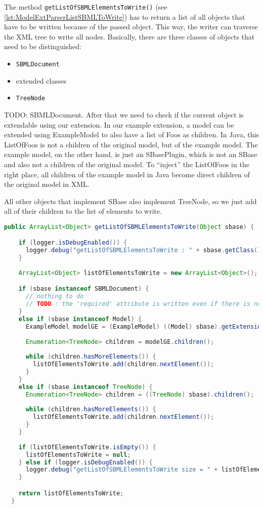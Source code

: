 The method \texttt{getListOfSBMLElementsToWrite()} (see \ref{lst:ModelExtParserListSBMLToWrite}) has to return a list of all objects that have to be written because of the passed object.
This way, the writer can traverse the XML tree to write all nodes.
Basically, there are three classes of objects that need to be distinguished:
\begin{itemize}
 \item \texttt{SBMLDocument}
 \item extended classes
 \item \texttt{TreeNode}
\end{itemize}
TODO: SBMLDocument.
After that we need to check if the current object is extendable using our extension.
In our example extension, a model can be extended using ExampleModel to also have a list of Foos as children.
In Java, this ListOfFoos is not a children of the original model, but of the example model.
The example model, on the other hand, is just an SBasePlugin, which is not an SBase and also not a children of the original model.
To ``inject'' the ListOfFoos in the right place, all children of the example model in Java become direct children of the original model in XML.

All other objects that implement SBase also implement TreeNode, so we just add all of their children to the list of elements to write.

\begin{lstlisting}[language=Java,caption={Extension parser: \texttt{getListOfSBMLElementsToWrite()}},label={lst:ModelExtParserListSBMLToWrite}]
  public ArrayList<Object> getListOfSBMLElementsToWrite(Object sbase) {

    if (logger.isDebugEnabled()) {
      logger.debug("getListOfSBMLElementsToWrite : " + sbase.getClass().getCanonicalName());
    }
    
    ArrayList<Object> listOfElementsToWrite = new ArrayList<Object>();

    if (sbase instanceof SBMLDocument) {
      // nothing to do
      // TODO : the 'required' attribute is written even if there is no plugin class for the SBMLDocument, so I am not totally sure how this is done.
    } 
    else if (sbase instanceof Model) {
      ExampleModel modelGE = (ExampleModel) ((Model) sbase).getExtension(ExampleConstant.namespaceURI);
      
      Enumeration<TreeNode> children = modelGE.children();
      
      while (children.hasMoreElements()) {
        listOfElementsToWrite.add(children.nextElement());
      }           
    } 
    else if (sbase instanceof TreeNode) {
      Enumeration<TreeNode> children = ((TreeNode) sbase).children();
      
      while (children.hasMoreElements()) {
        listOfElementsToWrite.add(children.nextElement());
      }
    }
    
    if (listOfElementsToWrite.isEmpty()) {
      listOfElementsToWrite = null;
    } else if (logger.isDebugEnabled()) {
      logger.debug("getListOfSBMLElementsToWrite size = " + listOfElementsToWrite.size());
    }

    return listOfElementsToWrite;
  }
\end{lstlisting}

